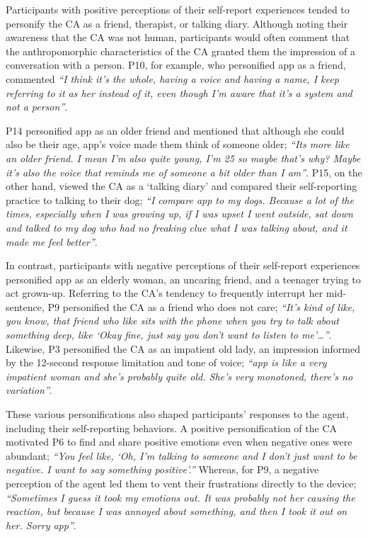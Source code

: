             Participants with positive perceptions of their self-report experiences tended to personify the \ac{CA} as a friend, therapist, or talking diary. Although noting their awareness that the \ac{CA} was not human, participants would often comment that the anthropomorphic characteristics of the \ac{CA} granted them the impression of a conversation with a person. P10, for example, who personified \acl{app} as a friend, commented \textit{``I think it's the whole, having a voice and having a name, I keep referring to it as her instead of it, even though I'm aware that it's a system and not a person''}. 
            
            P14 personified \acl{app} as an older friend and mentioned that although she could also be their age, \acl{app}'s voice made them think of someone older; \textit{``Its more like an older friend. I mean I'm also quite young, I'm 25 so maybe that's why? Maybe it's also the voice that reminds me of someone a bit older than I am''}. P15, on the other hand, viewed the \ac{CA} as a `talking diary' and compared their self-reporting practice to talking to their dog; \textit{``I compare \acl{app} to my dogs. Because a lot of the times, especially when I was growing up, if I was upset I went outside, sat down and talked to my dog who had no freaking clue what I was talking about, and it made me feel better''}.
            
            In contrast, participants with negative perceptions of their self-report experiences personified \acl{app} as an elderly woman, an uncaring friend, and a teenager trying to act grown-up. Referring to the \ac{CA}'s tendency to frequently interrupt her mid-sentence, P9 personified the \ac{CA} as a friend who does not care; \textit{``It's kind of like, you know, that friend who like sits with the phone when you try to talk about something deep, like `Okay fine, just say you don't want to listen to me'\ldots''}. Likewise, P3 personified the \ac{CA} as an impatient old lady, an impression informed by the 12-second response limitation and tone of voice; \textit{``\acl{app} is like a very impatient woman and she’s probably quite old. She’s very monotoned, there’s no variation''}.

            These various personifications also shaped participants' responses to the agent, including their self-reporting behaviors. A positive personification of the \ac{CA} motivated P6 to find and share positive emotions even when negative ones were abundant; \textit{``You feel like, `Oh, I'm talking to someone and I don't just want to be negative. I want to say something positive'.''} Whereas, for P9, a negative perception of the agent led them to vent their frustrations directly to the device; \textit{``Sometimes I guess it took my emotions out. 
            It was probably not her causing the reaction, but because I was annoyed about something, and then I took it out on her. Sorry \acl{app}''}.
      
